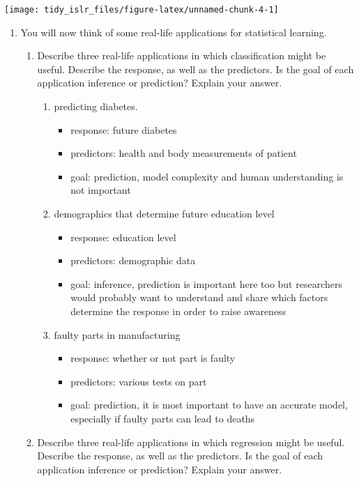 \documentclass[]{book}
\providecommand{\tightlist}{%
  \setlength{\itemsep}{0pt}\setlength{\parskip}{0pt}}
\begin{document}
\begin{center}\texttt{[image: tidy\_islr\_files/figure-latex/unnamed-chunk-4-1]} \end{center}

\begin{enumerate}
\def\labelenumi{\arabic{enumi}.}
\setcounter{enumi}{3}
\tightlist
\item
  You will now think of some real-life applications for statistical learning.

  \begin{enumerate}
  \def\labelenumii{(\alph{enumii})}
  \tightlist
  \item
    Describe three real-life applications in which classification might be useful. Describe the response, as well as the predictors. Is the goal of each application inference or prediction? Explain your answer.

    \begin{enumerate}
    \def\labelenumiii{\arabic{enumiii}.}
    \tightlist
    \item
      predicting diabetes.

      \begin{itemize}
      \tightlist
      \item
        response: future diabetes
      \item
        predictors: health and body measurements of patient
      \item
        goal: prediction, model complexity and human understanding is not important
      \end{itemize}
    \item
      demographics that determine future education level

      \begin{itemize}
      \tightlist
      \item
        response: education level
      \item
        predictors: demographic data
      \item
        goal: inference, prediction is important here too but researchers would probably want to understand and share which factors determine the response in order to raise awareness
      \end{itemize}
    \item
      faulty parts in manufacturing

      \begin{itemize}
      \tightlist
      \item
        response: whether or not part is faulty
      \item
        predictors: various tests on part
      \item
        goal: prediction, it is most important to have an accurate model, especially if faulty parts can lead to deaths
      \end{itemize}
    \end{enumerate}
  \item
    Describe three real-life applications in which regression might be useful. Describe the response, as well as the predictors. Is the goal of each application inference or prediction? Explain your answer.


\end{enumerate}
\end{enumerate}
\end{document}

